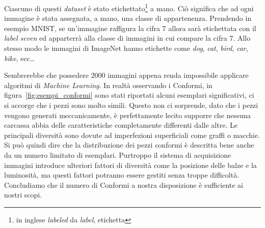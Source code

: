 Ciascuno di questi \textit{dataset} è stato etichettato\footnote{in inglese \textit{labeled} da \textit{label}, etichetta} a mano.
Ciò significa che ad ogni immagine è stata assegnata, a mano, una classe di appartenenza.
Prendendo in esempio MNIST, se un'immagine raffigura la cifra $7$ allora sarà etichettata con il \textit{label seven} ed apparterrà alla classe di immagini in cui compare la cifra $7$.
Allo stesso modo le immagini di ImageNet hanno etichette come \textit{dog}, \textit{cat}, \textit{bird}, \textit{car}, \textit{bike}, ecc\dots %

Sembrerebbe che possedere 2000 immagini appena renda impossibile applicare algoritmi di \textit{Machine Learning}.
In realtà osservando i Conformi, in figura~\ref{fig:esempi_conformi} sono stati riportati alcuni esemplari significativi, ci si accorge che i pezzi sono molto simili.
Questo non ci sorprende, dato che i pezzi vengono generati meccanicamente, è perfettamente lecito supporre che nessuna carcassa abbia delle caratteristiche completamente differenti dalle altre.
Le principali diversità sono dovute ad imperfezioni superficiali come graffi o macchie.
Si può quindi dire che la distribuzione dei pezzi conformi è descritta bene anche da un numero limitato di esemplari.
Purtroppo il sistema di acquisizione immagini introduce ulteriori fattori di diversità come la posizione delle balze e la luminosità, ma questi fattori potranno essere gestiti senza troppe difficoltà.
Concludiamo che il numero di Conformi a nostra disposizione è sufficiente ai nostri scopi.

